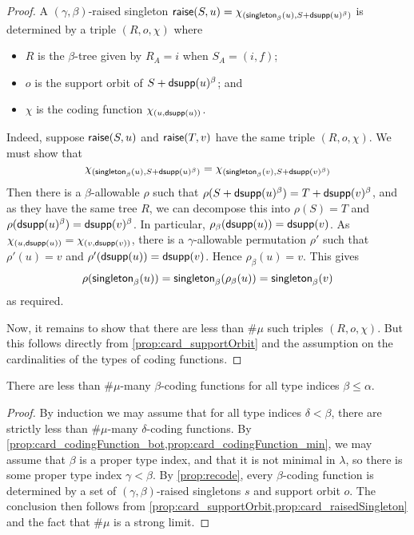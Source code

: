 \begin{proof}
  A \( (\gamma,\beta) \)-raised singleton \( \operatorname{\mathsf{raise}}(S,u) = \chi_{(\operatorname{\mathsf{singleton}}_\beta(u), S + \operatorname{\mathsf{dsupp}}(u)^\beta)} \) is determined by a triple \( (R, o, \chi) \) where
  \begin{itemize}
    \item \( R \) is the \( \beta \)-tree given by \( R_A = i \) when \( S_A = (i, f) \);
    \item \( o \) is the support orbit of \( S + \operatorname{\mathsf{dsupp}}(u)^\beta \); and
    \item \( \chi \) is the coding function \( \chi_{(u, \operatorname{\mathsf{dsupp}}(u))} \).
  \end{itemize}
  Indeed, suppose \( \operatorname{\mathsf{raise}}(S, u) \) and \( \operatorname{\mathsf{raise}}(T, v) \) have the same triple \( (R, o, \chi) \).
  We must show that
  \[ \chi_{(\operatorname{\mathsf{singleton}}_\beta(u), S + \operatorname{\mathsf{dsupp}}(u)^\beta)} = \chi_{(\operatorname{\mathsf{singleton}}_\beta(v), S + \operatorname{\mathsf{dsupp}}(v)^\beta)} \]
  Then there is a \( \beta \)-allowable \( \rho \) such that \( \rho(S + \operatorname{\mathsf{dsupp}}(u)^\beta) = T + \operatorname{\mathsf{dsupp}}(v)^\beta \), and as they have the same tree \( R \), we can decompose this into \( \rho(S) = T \) and \( \rho(\operatorname{\mathsf{dsupp}}(u)^\beta) = \operatorname{\mathsf{dsupp}}(v)^\beta \).
  In particular, \( \rho_\beta(\operatorname{\mathsf{dsupp}}(u)) = \operatorname{\mathsf{dsupp}}(v) \).
  As \( \chi_{(u, \operatorname{\mathsf{dsupp}}(u))} = \chi_{(v, \operatorname{\mathsf{dsupp}}(v))} \), there is a \( \gamma \)-allowable permutation \( \rho' \) such that \( \rho'(u) = v \) and \( \rho'(\operatorname{\mathsf{dsupp}}(u)) = \operatorname{\mathsf{dsupp}}(v) \).
  Hence \( \rho_\beta(u) = v \).
  This gives
  \[ \rho(\operatorname{\mathsf{singleton}}_\beta(u)) = \operatorname{\mathsf{singleton}}_\beta(\rho_\beta(u)) = \operatorname{\mathsf{singleton}}_\beta(v) \]
  as required.

  Now, it remains to show that there are less than \( \#\mu \) such triples \( (R, o, \chi) \).
  But this follows directly from \cref{prop:card_supportOrbit} and the assumption on the cardinalities of the types of coding functions.
\end{proof}
\begin{proposition}
  \label{prop:card_codingFunction}
  There are less than \( \#\mu \)-many \( \beta \)-coding functions for all type indices \( \beta \leq \alpha \).
\end{proposition}
\begin{proof}
  By induction we may assume that for all type indices \( \delta < \beta \), there are strictly less than \( \#\mu \)-many \( \delta \)-coding functions.
  By \cref{prop:card_codingFunction_bot,prop:card_codingFunction_min}, we may assume that \( \beta \) is a proper type index, and that it is not minimal in \( \lambda \), so there is some proper type index \( \gamma < \beta \).
  By \cref{prop:recode}, every \( \beta \)-coding function is determined by a set of \( (\gamma,\beta) \)-raised singletons \( s \) and support orbit \( o \).
  The conclusion then follows from \cref{prop:card_supportOrbit,prop:card_raisedSingleton} and the fact that \( \#\mu \) is a strong limit.
\end{proof}
